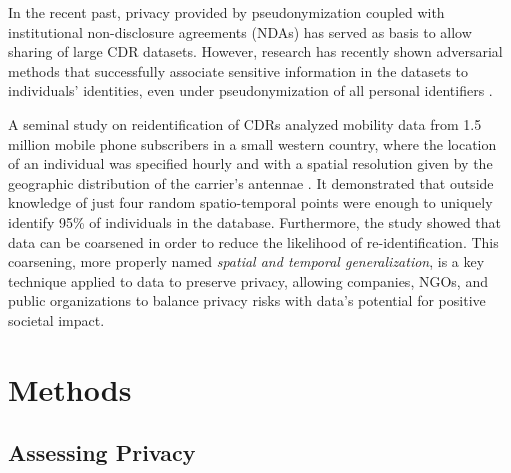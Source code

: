 \documentclass[12pt]{article}
\begin{document}
In the recent past, privacy provided by pseudonymization coupled with institutional non-disclosure agreements (NDAs) has served as basis to allow sharing of large CDR datasets. However, research has recently shown adversarial methods that successfully associate sensitive information in the datasets to individuals' identities, even under pseudonymization of all personal identifiers \cite{de2013unique, gramaglia2014anonymizability,song2014not, de2015unique, cecaj2016re, boutet2016uniqueness, narayanan2008robust,el2011systematic,wondracek2010practical}.

A seminal study on reidentification of CDRs analyzed mobility data from 1.5 million mobile phone subscribers in a small western country, where the location of an individual was specified hourly and with a spatial resolution given by the geographic distribution of the carrier's antennae \cite{de2013unique}. It demonstrated that outside knowledge of just four random spatio-temporal points were enough to uniquely identify 95\% of individuals in the database. Furthermore, the study showed that data can be coarsened in order to reduce the likelihood of re-identification. This coarsening, more properly named \textit{spatial and temporal generalization}, is a key technique applied to data to preserve privacy, allowing companies, NGOs, and public organizations to balance privacy risks with data's potential for positive societal impact.
\iffalse Data transformations of this kind, coupled with data sharing models of varying levels of security \textemdash such as open algorithm platforms, limited remote access, question and answer APIs, and legal non-disclosure agreements (NDAs) \cite{de2014d4d}\textemdash constitute the fundamental control variables that allow policy to balance and tradeoff between data privacy and its potential for positive societal impact.\fi



\section{Methods}
\vspace{10pt}

\subsection{\textbf{Assessing Privacy}}
\vspace{4pt}
\end{document}
